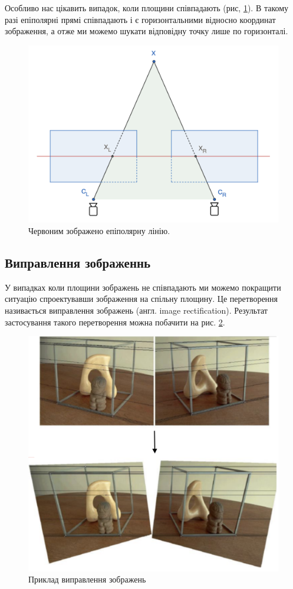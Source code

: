\documentclass{article}
\theoremstyle{definition}
\begin{document}
Особливо нас цікавить випадок, коли площини співпадають (рис, \ref{fig:epipolar_geometry_perfect}). В такому разі епіполярні прямі співпадають і є горизонтальними відносно координат зображення, а отже ми можемо шукати відповідну точку лише по горизонталі.

\begin{figure}[h]
	\includegraphics[width=0.7\linewidth]{epipolar_geometry_perfect}
	\centering
	\caption{Червоним зображено епіполярну лінію.}
	\label{fig:epipolar_geometry_perfect}
\end{figure}

\subsection{Виправлення зображеннь}
У випадках коли площини зображень не співпадають ми можемо покращити ситуацію спроектувавши зображення на спільну площину. Це перетворення називається виправлення зображень (англ. image rectification). Результат застосування такого перетворення можна побачити на рис. \ref{fig:rectification_example}.

\begin{figure}[h]
	\includegraphics[width=0.7\linewidth]{rectification_example}
	\centering
	\caption{Приклад виправлення зображень}
	\label{fig:rectification_example}
\end{figure}
\end{document}
